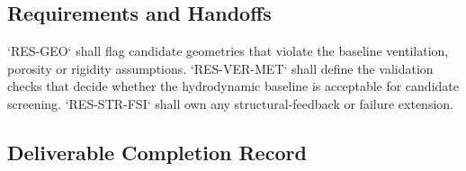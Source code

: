\subsection{Requirements and Handoffs}
\label{sec:res-mod-asm-requirements}


`RES-GEO` shall flag candidate geometries that violate the baseline
ventilation, porosity or rigidity assumptions. `RES-VER-MET` shall
define the validation checks that decide whether the hydrodynamic
baseline is acceptable for candidate screening. `RES-STR-FSI` shall own
any structural-feedback or failure extension.

\subsection{Deliverable Completion Record}
\label{sec:res-mod-asm-completion-record}

%
%
%
